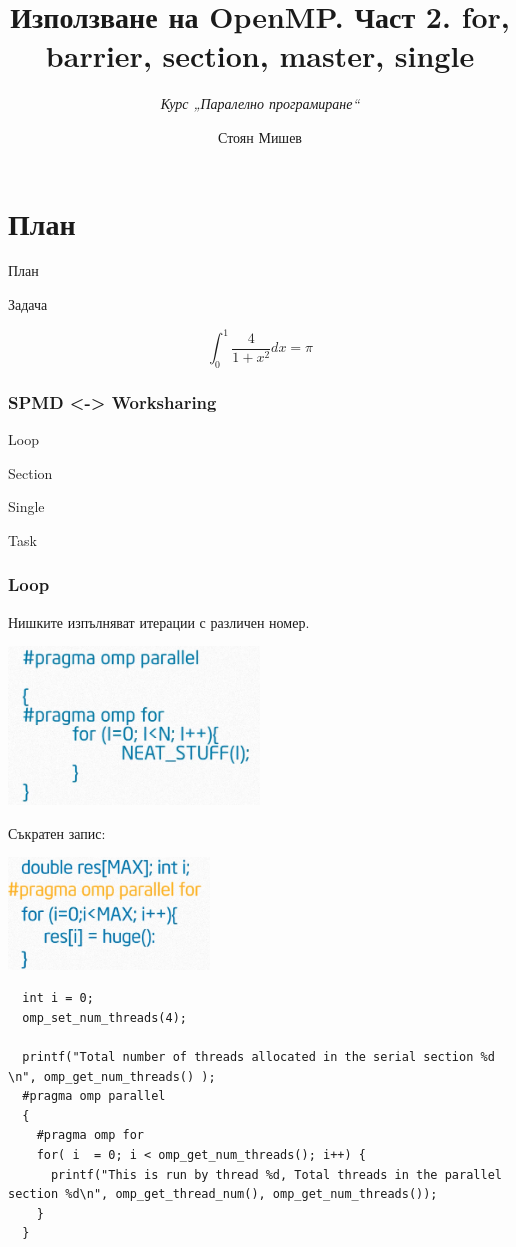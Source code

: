 \documentclass{beamer}
\title{Използване на OpenMP. Част 2. for, barrier, section, master, single }
\subtitle{\textit{Курс „Паралелно програмиране“}}
\author{\newline \newline Стоян Мишев}
\date{} %
\begin{document}
\lstset{language=Python}
{ 
\frame{\titlepage}}


\section*{План}\begin{frame}{План}\tableofcontents\end{frame}


\begin{frame}[plain]{Задача}

  \begin{equation}
    \int_0^1 \frac{4}{1+x^2} dx = \pi  \nonumber
  \end{equation}
\end{frame}

\begin{frame}
  \frametitle{SPMD <-> Worksharing}
  Loop

  Section

  Single

  Task
\end{frame}


\begin{frame}
  \frametitle{Loop}
  Нишките изпълняват итерации с различен номер.

  \centering
  \includegraphics[width=0.5\textwidth]{for}  \pause

  Съкратен запис:

  \includegraphics[width=0.4\textwidth]{for-short}
\end{frame}

\begin{frame}
\scriptsize
\lstset{language=C++}
\begin{lstlisting}
  int i = 0;
  omp_set_num_threads(4);

  printf("Total number of threads allocated in the serial section %d \n", omp_get_num_threads() );
  #pragma omp parallel 
  {
    #pragma omp for
    for( i  = 0; i < omp_get_num_threads(); i++) {
      printf("This is run by thread %d, Total threads in the parallel section %d\n", omp_get_thread_num(), omp_get_num_threads());
    }
  }
\end{lstlisting}
\end{frame}
\end{document}

